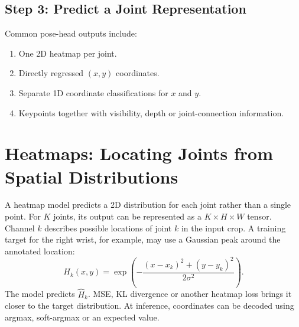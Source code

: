 \documentclass[11pt,a4paper,oneside]{report}
\begin{document}
\subsection{Step 3: Predict a Joint Representation}

Common pose-head outputs include:
\begin{enumerate}
  \item One 2D heatmap per joint.
  \item Directly regressed $(x,y)$ coordinates.
  \item Separate 1D coordinate classifications for $x$ and $y$.
  \item Keypoints together with visibility, depth or joint-connection information.
\end{enumerate}

\clearpage

\section{Heatmaps: Locating Joints from Spatial Distributions}

A heatmap model predicts a 2D distribution for each joint rather than a single point. For $K$ joints, its output can be represented as a $K\times H\times W$ tensor. Channel $k$ describes possible locations of joint $k$ in the input crop. A training target for the right wrist, for example, may use a Gaussian peak around the annotated location:
\[
H_k(x,y)=\exp\left(-\frac{(x-x_k)^2+(y-y_k)^2}{2\sigma^2}\right).
\]
The model predicts $\hat H_k$. MSE, KL divergence or another heatmap loss brings it closer to the target distribution. At inference, coordinates can be decoded using argmax, soft-argmax or an expected value.
\end{document}
